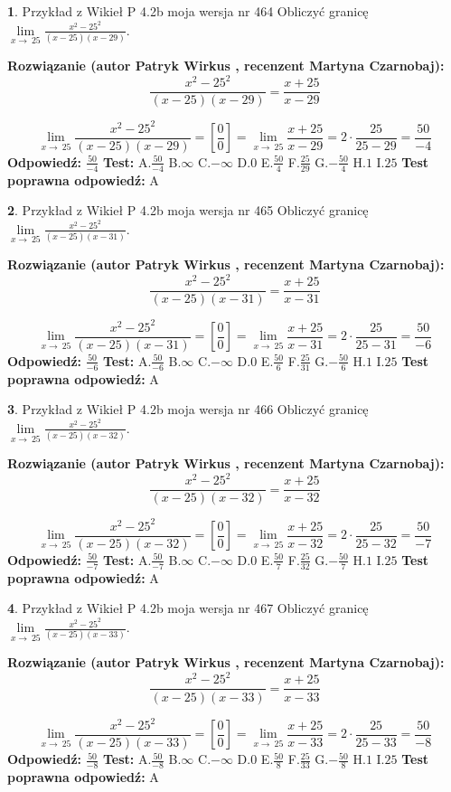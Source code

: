 \documentclass[12pt, a4paper]{article}
\theoremstyle{definition} %
\newtheorem{zad}{}
\newcommand{\zadStart}[1]{\begin{zad}#1\newline}
\newcommand{\zadStop}{\end{zad}}
\newcommand{\rozwStart}[2]{\noindent \textbf{Rozwiązanie (autor #1 , recenzent #2): }\newline}
\newcommand{\rozwStop}{\newline}
\newcommand{\odpStart}{\noindent \textbf{Odpowiedź:}\newline}
\newcommand{\odpStop}{\newline}
\newcommand{\testStart}{\noindent \textbf{Test:}\newline}
\newcommand{\testStop}{\newline}
\newcommand{\kluczStart}{\noindent \textbf{Test poprawna odpowiedź:}\newline}
\newcommand{\kluczStop}{\newline}
\begin{document}
\zadStart{Przykład z Wikieł P 4.2b moja wersja nr 464}
Obliczyć granicę $\lim\limits_{x\to\ 25}\frac{x^{2}-25^{2}}{(x-25)(x-29)}$.
\zadStop
\rozwStart{Patryk Wirkus}{Martyna Czarnobaj}
$$\frac{x^{2}-25^{2}}{(x-25)(x-29)}=\frac{x+25}{x-29}$$

$$\lim\limits_{x\to\ 25}\frac{x^{2}-25^{2}}{(x-25)(x-29)}=[\frac{0}{0}]=\lim\limits_{x\to\ 25}\frac{x+25}{x-29}=2 \cdot \frac{25}{25-29} = \frac{50}{-4}$$
\rozwStop
\odpStart
$\frac{50}{-4}$
\odpStop
\testStart
A.$\frac{50}{-4}$
B.$\infty$
C.$-\infty$
D.$0$
E.$\frac{50}{4}$
F.$\frac{25}{29}$
G.$-\frac{50}{4}$
H.$1$
I.$25$
\testStop
\kluczStart
A
\kluczStop



\zadStart{Przykład z Wikieł P 4.2b moja wersja nr 465}
Obliczyć granicę $\lim\limits_{x\to\ 25}\frac{x^{2}-25^{2}}{(x-25)(x-31)}$.
\zadStop
\rozwStart{Patryk Wirkus}{Martyna Czarnobaj}
$$\frac{x^{2}-25^{2}}{(x-25)(x-31)}=\frac{x+25}{x-31}$$

$$\lim\limits_{x\to\ 25}\frac{x^{2}-25^{2}}{(x-25)(x-31)}=[\frac{0}{0}]=\lim\limits_{x\to\ 25}\frac{x+25}{x-31}=2 \cdot \frac{25}{25-31} = \frac{50}{-6}$$
\rozwStop
\odpStart
$\frac{50}{-6}$
\odpStop
\testStart
A.$\frac{50}{-6}$
B.$\infty$
C.$-\infty$
D.$0$
E.$\frac{50}{6}$
F.$\frac{25}{31}$
G.$-\frac{50}{6}$
H.$1$
I.$25$
\testStop
\kluczStart
A
\kluczStop



\zadStart{Przykład z Wikieł P 4.2b moja wersja nr 466}
Obliczyć granicę $\lim\limits_{x\to\ 25}\frac{x^{2}-25^{2}}{(x-25)(x-32)}$.
\zadStop
\rozwStart{Patryk Wirkus}{Martyna Czarnobaj}
$$\frac{x^{2}-25^{2}}{(x-25)(x-32)}=\frac{x+25}{x-32}$$

$$\lim\limits_{x\to\ 25}\frac{x^{2}-25^{2}}{(x-25)(x-32)}=[\frac{0}{0}]=\lim\limits_{x\to\ 25}\frac{x+25}{x-32}=2 \cdot \frac{25}{25-32} = \frac{50}{-7}$$
\rozwStop
\odpStart
$\frac{50}{-7}$
\odpStop
\testStart
A.$\frac{50}{-7}$
B.$\infty$
C.$-\infty$
D.$0$
E.$\frac{50}{7}$
F.$\frac{25}{32}$
G.$-\frac{50}{7}$
H.$1$
I.$25$
\testStop
\kluczStart
A
\kluczStop



\zadStart{Przykład z Wikieł P 4.2b moja wersja nr 467}
Obliczyć granicę $\lim\limits_{x\to\ 25}\frac{x^{2}-25^{2}}{(x-25)(x-33)}$.
\zadStop
\rozwStart{Patryk Wirkus}{Martyna Czarnobaj}
$$\frac{x^{2}-25^{2}}{(x-25)(x-33)}=\frac{x+25}{x-33}$$

$$\lim\limits_{x\to\ 25}\frac{x^{2}-25^{2}}{(x-25)(x-33)}=[\frac{0}{0}]=\lim\limits_{x\to\ 25}\frac{x+25}{x-33}=2 \cdot \frac{25}{25-33} = \frac{50}{-8}$$
\rozwStop
\odpStart
$\frac{50}{-8}$
\odpStop
\testStart
A.$\frac{50}{-8}$
B.$\infty$
C.$-\infty$
D.$0$
E.$\frac{50}{8}$
F.$\frac{25}{33}$
G.$-\frac{50}{8}$
H.$1$
I.$25$
\testStop
\kluczStart
A
\kluczStop
\end{document}

